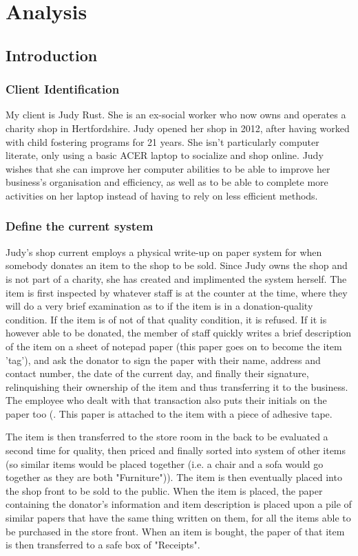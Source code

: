 \chapter{Analysis}

\section{Introduction}

\subsection{Client Identification}
My client is Judy Rust. She is an ex-social worker who now owns and operates a charity shop in Hertfordshire. Judy opened her shop in 2012, after having worked with child fostering programs for 21 years. She isn't particularly computer literate, only using a basic ACER laptop to socialize and shop online. Judy wishes that she can improve her computer abilities to be able to improve her business's organisation and efficiency, as well as to be able to complete more activities on her laptop instead of having to rely on less efficient methods.
\subsection{Define the current system}
Judy's shop current employs a physical write-up on paper system for when somebody donates an item to the shop to be sold. Since Judy owns the shop and is not part of a charity, she has created and implimented the system herself. The item is first inspected by whatever staff is at the counter at the time, where they will do a very brief examination as to if the item is in a donation-quality condition. If the item is of not of that quality condition, it is refused. If it is however able to be donated, the member of staff quickly writes a brief description of the item on a sheet of notepad paper (this paper goes on to become the item 'tag'), and ask the donator to sign the paper with their name, address and contact number, the date of the current day, and finally their signature, relinquishing their ownership of the item and thus transferring it to the business. The employee who dealt with that transaction also puts their initials on the paper too (. This paper is attached to the item with a piece of adhesive tape.

 The item is then transferred to the store room in the back to be evaluated a second time for quality, then priced and finally sorted into system of other items (so similar items would be placed together (i.e. a chair and a sofa would go together as they are both "Furniture")). The item is then eventually placed into the shop front to be sold to the public. When the item is placed, the paper containing the donator's information and item description is placed upon a pile of similar papers that have the same thing written on them, for all the items able to be purchased in the store front. When an item is bought, the paper of that item is then transferred to a safe box of "Receipts".
